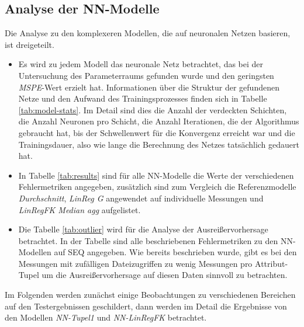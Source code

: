 \documentclass[
	12pt,
	a4paper,
	BCOR10mm,
	DIV14,
	listof=totoc,
	bibliography=totoc,
	headsepline
]{scrreprt}
\begin{document}
\subsection{Analyse der NN-Modelle}
Die Analyse zu den komplexeren Modellen, die auf neuronalen Netzen basieren, ist dreigeteilt. 
\begin{itemize}
	\item Es wird zu jedem Modell das neuronale Netz betrachtet, das bei der Untersuchung des Parameterraums gefunden wurde und den geringsten \textit{MSPE}-Wert erzielt hat.
Informationen über die Struktur der gefundenen Netze und den Aufwand des Trainingsprozesses finden sich in Tabelle \ref{tab:model-stats}. Im Detail sind dies die Anzahl der verdeckten Schichten, die Anzahl Neuronen pro Schicht, die Anzahl Iterationen, die der Algorithmus gebraucht hat, bis der Schwellenwert für die Konvergenz erreicht war und die Trainingsdauer, also wie lange die Berechnung des Netzes tatsächlich gedauert hat.
	\item In Tabelle \ref{tab:results} sind für alle NN-Modelle die Werte der verschiedenen Fehlermetriken angegeben, zusätzlich sind zum Vergleich die Referenzmodelle \textit{Durchschnitt}, \textit{LinReg G} angewendet auf individuelle Messungen und \textit{LinRegFK Median agg} aufgelistet.
	\item Die Tabelle \ref{tab:outlier} wird für die Analyse der Ausreißervorhersage betrachtet. In der Tabelle sind alle beschriebenen Fehlermetriken zu den NN-Modellen auf SEQ angegeben. Wie bereits beschrieben wurde, gibt es bei den Messungen mit zufälligen Dateizugriffen zu wenig Messungen pro Attribut-Tupel um die Ausreißervorhersage auf diesen Daten sinnvoll zu betrachten.
\end{itemize}
Im Folgenden werden zunächst einige Beobachtungen zu verschiedenen Bereichen auf den Testergebnissen geschildert, dann werden im Detail die Ergebnisse von den Modellen \textit{NN-Tupel1} und \textit{NN-LinRegFK} betrachtet.
\end{document}
